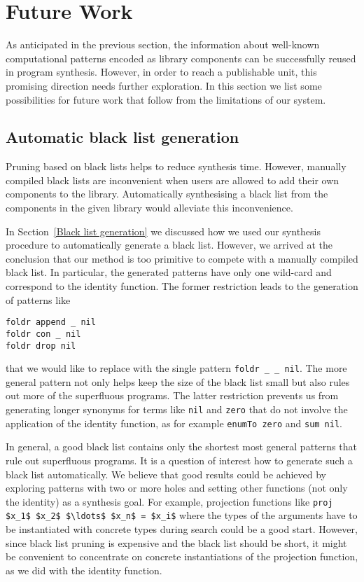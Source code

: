 \section{Future Work}

As anticipated in the previous section, the information about well-known computational patterns encoded as library components can be successfully reused in program synthesis. However, in order to reach a publishable unit, this promising direction needs further exploration. In this section we list some possibilities for future work that follow from the limitations of our system.

\subsection{Automatic black list generation}
Pruning based on black lists helps to reduce synthesis time. However, manually compiled black lists are inconvenient when users are allowed to add their own components to the library. Automatically synthesising a black list from the components in the given library would alleviate this inconvenience.

In Section~\ref{Black list generation} we discussed how we used our synthesis procedure to automatically generate a black list. However, we arrived at the conclusion that our method is too primitive to compete with a manually compiled black list. In particular, the generated patterns have only one wild-card and correspond to the identity function. The former restriction leads to the generation of patterns like
\begin{lstlisting}[style=plain]
foldr append _ nil
foldr con _ nil
foldr drop nil
\end{lstlisting}
that we would like to replace with the single pattern \lstinline!foldr _ _ nil!. The more general pattern not only helps keep the size of the black list small but also rules out more of the superfluous programs.
The latter restriction prevents us from generating longer synonyms for terms like \lstinline!nil! and \lstinline!zero! that do not involve the application of the identity function, as for example \lstinline!enumTo zero! and \lstinline!sum nil!.

In general, a good black list contains only the shortest most general patterns that rule out superfluous programs. It is a question of interest how to generate such a black list automatically. We believe that good results could be achieved by exploring patterns with two or more holes and setting other functions (not only the identity) as a synthesis goal. For example, projection functions like \lstinline!proj $x_1$ $x_2$ $\ldots$ $x_n$ = $x_i$! where the types of the arguments have to be instantiated with concrete types during search could be a good start. However, since black list pruning is expensive and the black list should be short, it might be convenient to concentrate on concrete instantiations of the projection function, as we did with the identity function.


